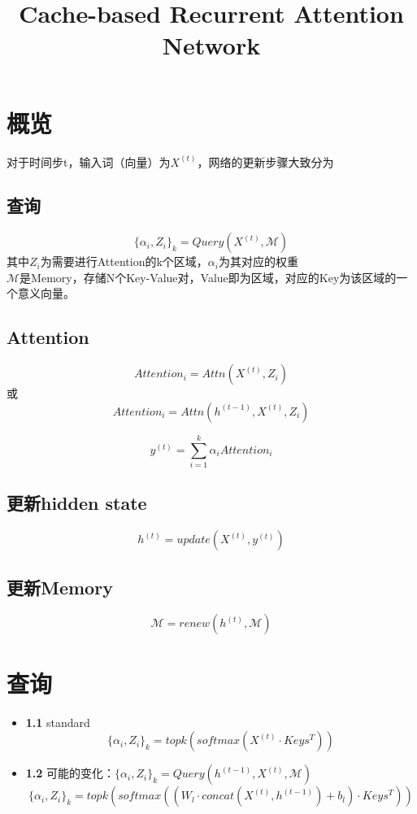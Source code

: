 \documentclass{article}
\title{Cache-based Recurrent Attention Network} %
\author{%
}
\date{} %
\begin{document}
\maketitle

\section*{概览}
	对于时间步t，输入词（向量）为$X^{(t)}$，网络的更新步骤大致分为
	\subsection*{查询}
		\begin{equation}
			\{\alpha_i, Z_i\}_k = Query(X^{(t)}, \mathcal{M})
		\end{equation}
		其中$Z_i$为需要进行Attention的k个区域，$\alpha_i$为其对应的权重\\
		$\mathcal{M}$是Memory，存储N个Key-Value对，Value即为区域，对应的Key为该区域的一个意义向量。
	\subsection*{Attention}
		\begin{equation}
			Attention_i = Attn(X^{(t)}, Z_i)
		\end{equation}
		或
		\begin{equation}
			Attention_i = Attn(h^{(t-1)},X^{(t)}, Z_i)
		\end{equation}
		
		\begin{equation}
			y^{(t)} = \sum_{i=1}^k \alpha_i Attention_i
		\end{equation}
	\subsection*{更新hidden state}
		\begin{equation}
			h^{(t)} = update(X^{(t)}, y^{(t)})
		\end{equation}
	\subsection*{更新Memory}
		\begin{equation}
			\mathcal{M} = renew(h^{(t)}, \mathcal{M})
		\end{equation}
\section{查询}
		\begin{itemize}
			\item \textbf{1.1} standard
			$$\{\alpha_i, Z_i\}_k = topk(softmax(X^{(t)}\cdot Keys^T))$$

		\item \textbf{1.2} 可能的变化：$\{\alpha_i, Z_i\}_k = Query(h^{(t-1)}, X^{(t)}, \mathcal{M})$
			$$\{\alpha_i, Z_i\}_k = topk(softmax((W_l\cdot concat(X^{(t)}, h^{(t-1)}) + b_l)\cdot Keys^T))$$
	\end{itemize}
\end{document}
